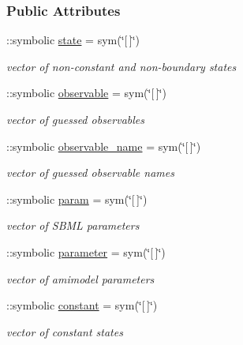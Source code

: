\subsubsection*{Public Attributes}
\begin{DoxyCompactItemize}
\item 
\+::symbolic \hyperlink{class_s_b_m_lode_adc6e5733fc3c22f0a7b2914188c49c90}{state} = sym(\char`\"{}\mbox{[}$\,$\mbox{]}\char`\"{})
\begin{DoxyCompactList}\small\item\em vector of non-\/constant and non-\/boundary states \end{DoxyCompactList}\item 
\+::symbolic \hyperlink{class_s_b_m_lode_a072b6f6192ac4f40e74b69f901ecdfef}{observable} = sym(\char`\"{}\mbox{[}$\,$\mbox{]}\char`\"{})
\begin{DoxyCompactList}\small\item\em vector of guessed observables \end{DoxyCompactList}\item 
\+::symbolic \hyperlink{class_s_b_m_lode_a6e638e3379dc2d099b3cf3083246fbe0}{observable\+\_\+name} = sym(\char`\"{}\mbox{[}$\,$\mbox{]}\char`\"{})
\begin{DoxyCompactList}\small\item\em vector of guessed observable names \end{DoxyCompactList}\item 
\+::symbolic \hyperlink{class_s_b_m_lode_a51f20d6b1b54a2eee3be0e8adc96a0ae}{param} = sym(\char`\"{}\mbox{[}$\,$\mbox{]}\char`\"{})
\begin{DoxyCompactList}\small\item\em vector of S\+B\+M\+L parameters \end{DoxyCompactList}\item 
\+::symbolic \hyperlink{class_s_b_m_lode_a0d71b5c1dcca8d3fee88d6a11d3e2071}{parameter} = sym(\char`\"{}\mbox{[}$\,$\mbox{]}\char`\"{})
\begin{DoxyCompactList}\small\item\em vector of amimodel parameters \end{DoxyCompactList}\item 
\+::symbolic \hyperlink{class_s_b_m_lode_a391f14c28a859734cd091e4e521bb8f8}{constant} = sym(\char`\"{}\mbox{[}$\,$\mbox{]}\char`\"{})
\begin{DoxyCompactList}\small\item\em vector of constant states \end{DoxyCompactList}\item 

\end{DoxyCompactItemize}
